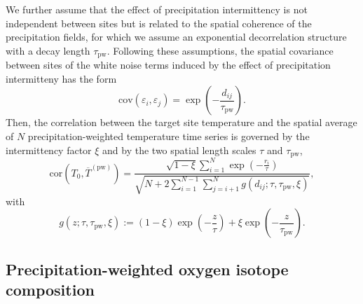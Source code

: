 \documentclass[cp, manuscript, draft]{copernicus}
\begin{document}
We further assume that the effect of precipitation intermittency is not
independent between sites but is related to the spatial coherence of the
precipitation fields, for which we assume an exponential decorrelation structure
with a decay length $\tau_{\mathrm{pw}}$. Following these assumptions, the
spatial covariance between sites of the white noise terms induced by the effect
of precipitation intermitteny has the form
%
\begin{equation}
\label{eq:noise.cov}
\mathrm{cov}(\varepsilon_i,\varepsilon_j)=
\exp{\left(-\frac{d_{ij}}{\tau_{\mathrm{pw}}}\right)}.
\end{equation}
%
Then, the correlation between the target site temperature and the spatial
average of $N$ precipitation-weighted temperature time series is governed by the
intermittency factor $\xi$ and by the two spatial length scales $\tau$ and
$\tau_{\mathrm{pw}}$,
%
\begin{equation}
\label{eq:t2m.pw.corr}
\mathrm{cor}\left(T_0,\overline{T}^{\mathrm{(pw)}}\right)=
\frac
{\sqrt{1-\xi}\sum_{i=1}^{N}\exp{\left(-\frac{r_i}{\tau}\right)}}
{\sqrt{N + 2\sum_{i=1}^{N-1}\sum_{j=i+1}^{N}
  g(d_{ij}; \tau, \tau_{\mathrm{pw}}, \xi)}},
\end{equation}
%
with
\begin{equation}
\label{eq:exp.fun}
g(z; \tau, \tau_{\mathrm{pw}}, \xi):=
(1-\xi)\exp{\left(-\frac{z}{\tau}\right)} +
\xi\exp{\left(-\frac{z}{\tau_{\mathrm{pw}}}\right)}.
\end{equation}

\subsection{Precipitation-weighted oxygen isotope composition}
\label{app:concept.model.oxy.pw}
\end{document}
